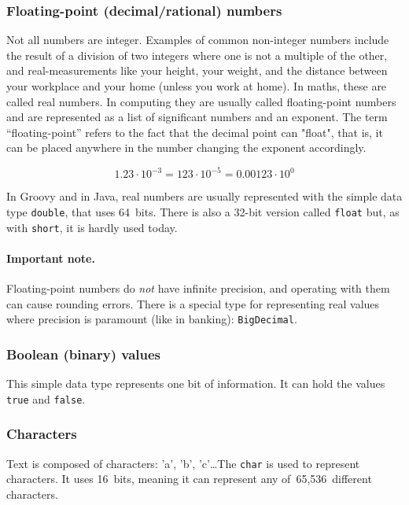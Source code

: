\subsubsection{Floating-point (decimal/rational) numbers}
\label{sec:float-point-decim}

Not all numbers are integer. Examples of common non-integer numbers
include the result of a division of two integers where one is not a
multiple of the other, and real-measurements like your height, your
weight, and the distance between your workplace and your home (unless
you work at home). In maths, these are called real numbers. In
computing they are usually called floating-point numbers and are
represented as a list of significant numbers and an exponent. The term
``floating-point'' refers to the fact that the decimal point can "float",
that is, it can be placed anywhere in the number changing the exponent
accordingly. 

$$ 1.23 \cdot 10^{-3} = 123 \cdot 10^{-5} = 0.00123 \cdot 10^0 $$

In Groovy and in Java, real numbers are usually represented with the
simple data type \verb+double+, that uses 64~bits. There is also a
32-bit version called \verb+float+ but, as with \verb+short+, it is
hardly used today.

\paragraph{Important note.} 

Floating-point numbers do \emph{not} have infinite precision, and
operating with them can cause rounding errors. There is a special type
for representing real values where precision is paramount (like in
banking): \verb+BigDecimal+. 

\subsubsection{Boolean (binary) values}
\label{sec:bool-binary-valu}

This simple data type represents one bit of information. It can hold
the values \verb+true+ and \verb+false+. 

\subsubsection{Characters}
\label{sec:characters}

Text is composed of characters: 'a', 'b', 'c'\ldots The \verb+char+ is
used to represent characters. It uses 16~bits, meaning it can
represent any of~65,536~different characters. 

